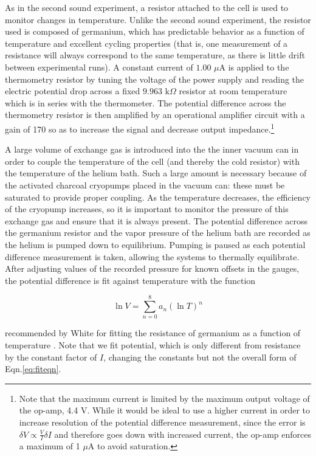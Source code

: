 As in the second sound experiment, a resistor attached to the cell is
used to monitor changes in temperature. Unlike the second sound
experiment, the resistor used is composed of germanium, which has
predictable behavior as a function of temperature and excellent
cycling properties (that is, one measurement of a resistance will
always correspond to the same temperature, as there is little drift
between experimental runs). A constant current of $1.00$ $\mu$A is
applied to the thermometry resistor by tuning the voltage of the power
supply and reading the electric potential drop across a fixed $9.963$
k$\Omega$ resistor at room temperature which is in series with the
thermometer. The potential difference across the thermometry resistor
is then amplified by an operational amplifier circuit with a gain of
170 so as to increase the signal and decrease output impedance.\footnote{Note that the maximum current is limited by the maximum
  output voltage of the op-amp, 4.4 V. While it would be ideal to
  use a higher current in order to increase resolution of the
  potential difference measurement, since the error is $\delta V
  \propto \frac{V}{I} \delta I$ and therefore goes down with increased
  current, the op-amp enforces a maximum of 1 $\mu$A to avoid
  saturation.}

A large volume of exchange gas is introduced into the the inner vacuum
can in order to couple the temperature of the cell (and thereby the
cold resistor) with the temperature of the helium bath. Such a large
amount is necessary because of the activated charcoal cryopumps
placed in the vacuum can: these must be saturated to provide proper
coupling. As the temperature decreases, the efficiency of the cryopump
increases, so it is important to monitor the pressure of this exchange
gas and ensure that it is always present. The potential difference
across the germanium resistor and the vapor pressure of the helium
bath are recorded as the helium is pumped down to equilibrium. Pumping
is paused as each potential difference measurement is taken, allowing
the systems to thermally equilibrate. After adjusting values of the
recorded pressure for known offsets in the gauges, the potential
difference is fit against temperature with the function

\begin{equation}
\label{eq:fiteqn}
\ln{V} = \sum_{n=0}^{8} a_{n} (\ln{T})^{n}
\end{equation}

recommended by White for fitting the resistance of germanium as a
function of temperature \cite{white}. Note that we fit potential,
which is only different from resistance by the constant factor of $I$,
changing the constants but not the overall form of
Eqn.\ref{eq:fiteqn}.

